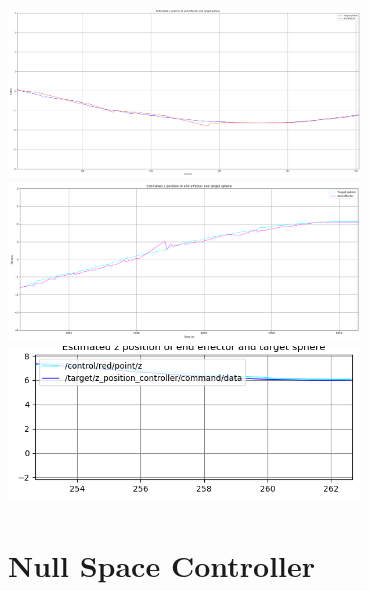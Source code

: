 \documentclass[11pt]{article}
\begin{document}
\begin{center}
\includegraphics[width=0.7\textwidth]{figures/x-position-1.png}
\includegraphics[width=0.7\textwidth]{figures/y-position-1.png}
\includegraphics[width=0.7\textwidth]{figures/z-position.png}
\end{center}

\section{Null Space Controller}
\end{document}
